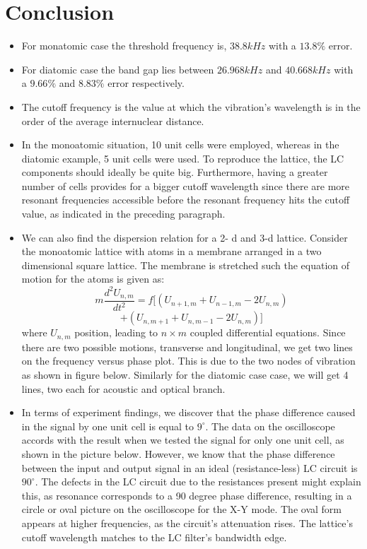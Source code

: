 \section{Conclusion}
	\begin{itemize}
		\item For monatomic case the threshold frequency is, $38.8kHz$ with a $13.8\%$ error.
		\item For diatomic case the band gap lies between $26.968kHz$ and $40.668kHz$ with a $9.66\%$ and $8.83\%$ error respectively.
		\item The cutoff frequency is the value at which the vibration's wavelength is in the order of the average internuclear distance.
		\item In the monoatomic situation, 10 unit cells were employed, whereas in the diatomic example, 5 unit cells were used. To reproduce the lattice, the LC components should ideally be quite big. Furthermore, having a greater number of cells provides for a bigger cutoff wavelength since there are more resonant frequencies accessible before the resonant frequency hits the cutoff value, as indicated in the preceding paragraph.
		\item We can also find the dispersion relation for a 2- d and 3-d lattice. Consider the monoatomic lattice with atoms in a membrane arranged in a two dimensional square lattice. The membrane is stretched such the equation of motion for the atoms is given as:
		$$m\frac{d^2U_{n,m}}{dt^2} = f[(U_{n+1,m}+U_{n-1,m}-2U_{n,m})$$
		$$+(U_{n,m+1}+U_{n,m-1}-2U_{n,m})]$$
		where $U_{n,m}$ position, leading to $n\times m$ coupled differential equations. Since there are two possible motions, transverse and longitudinal, we get two lines on the frequency versus phase plot. This is due to the two nodes of vibration as shown in figure below. Similarly for the diatomic case case, we will get 4 lines, two each for acoustic and optical branch.
		\item In terms of experiment findings, we discover that the phase difference caused in the signal by one unit cell is equal to $9^{\circ}$. The data on the oscilloscope accords with the result when we tested the signal for only one unit cell, as shown in the picture below. However, we know that the phase difference between the input and output signal in an ideal (resistance-less) LC circuit is $90^{\circ}$. The defects in the LC circuit due to the resistances present might explain this, as resonance corresponds to a 90 degree phase difference, resulting in a circle or oval picture on the oscilloscope for the X-Y mode. The oval form appears at higher frequencies, as the circuit's attenuation rises. The lattice's cutoff wavelength matches to the LC filter's bandwidth edge.
	\end{itemize}

